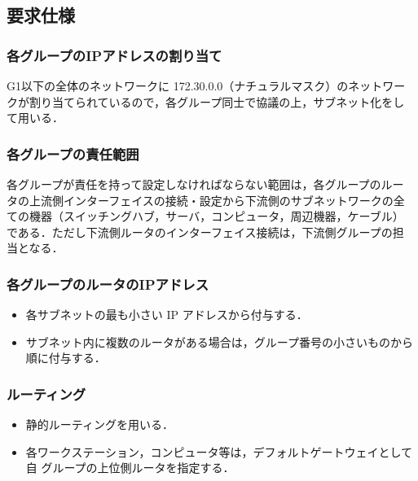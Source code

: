 \subsection{要求仕様}

\subsubsection{各グループのIPアドレスの割り当て}
G1以下の全体のネットワークに 172.30.0.0（ナチュラルマスク）のネットワー
クが割り当てられているので，各グループ同士で協議の上，サブネット化をし
て用いる．

\subsubsection{各グループの責任範囲}
各グループが責任を持って設定しなければならない範囲は，各グループのルー
タの上流側インターフェイスの接続・設定から下流側のサブネットワークの全
ての機器（スイッチングハブ，サーバ，コンピュータ，周辺機器，ケーブル）
である．ただし下流側ルータのインターフェイス接続は，下流側グループの担
当となる．

\subsubsection{各グループのルータのIPアドレス}
\begin{itemize}
\item 各サブネットの最も小さい IP アドレスから付与する．
\item サブネット内に複数のルータがある場合は，グループ番号の小さいものから順に付与する．
\end{itemize}

\subsubsection{ルーティング}
\begin{itemize}
\item 静的ルーティングを用いる．
\item 各ワークステーション，コンピュータ等は，デフォルトゲートウェイとして自
グループの上位側ルータを指定する．
\end{itemize}

